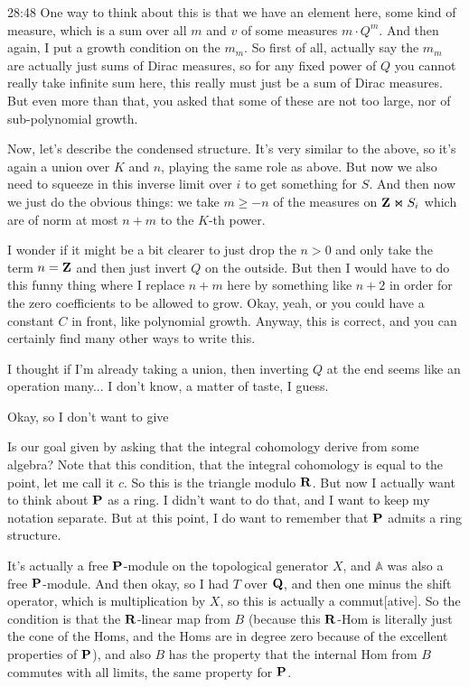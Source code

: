 \begin{unfinished}{28:48}
One way to think about this is that we have an element here, some kind of measure, which is a sum over all $m$ and $v$ of some measures $m \cdot Q^m$. And then again, I put a growth condition on the $m_m$. So first of all, actually say the $m_m$ are actually just sums of Dirac measures, so for any fixed power of $Q$ you cannot really take infinite sum here, this really must just be a sum of Dirac measures. But even more than that, you asked that some of these are not too large, nor of sub-polynomial growth.

Now, let's describe the condensed structure. It's very similar to the above, so it's again a union over $K$ and $n$, playing the same role as above. But now we also need to squeeze in this inverse limit over $i$ to get something for $S$. And then now we just do the obvious things: we take $m \geq -n$ of the measures on $\Z \Join S_i$ which are of norm at most $n + m$ to the $K$-th power.

I wonder if it might be a bit clearer to just drop the $n > 0$ and only take the term $n = \Z$ and then just invert $Q$ on the outside. But then I would have to do this funny thing where I replace $n + m$ here by something like $n + 2$ in order for the zero coefficients to be allowed to grow. Okay, yeah, or you could have a constant $C$ in front, like polynomial growth. Anyway, this is correct, and you can certainly find many other ways to write this.

I thought if I'm already taking a union, then inverting $Q$ at the end seems like an operation many... I don't know, a matter of taste, I guess.

Okay, so I don't want to give

Is our goal given by asking that the integral cohomology derive from some algebra? Note that this condition, that the integral cohomology is equal to the point, let me call it $c$. So this is the triangle modulo $\R$. But now I actually want to think about $\P$ as a ring. I didn't want to do that, and I want to keep my notation separate. But at this point, I do want to remember that $\P$ admits a ring structure.

It's actually a free $\P$-module on the topological generator $X$, and $\mathbb{A}$ was also a free $\P$-module. And then okay, so I had $T$ over $\Q$, and then one minus the shift operator, which is multiplication by $X$, so this is actually a commut[ative]. So the condition is that the $\R$-linear map from $B$ (because this $\R$-Hom is literally just the cone of the Homs, and the Homs are in degree zero because of the excellent properties of $\P$), and also $B$ has the property that the internal Hom from $B$ commutes with all limits, the same property for $\P$.


\end{unfinished}
